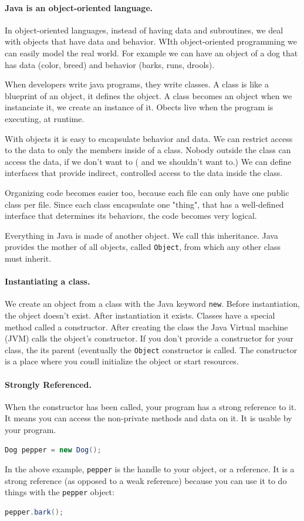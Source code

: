 \paragraph{Java is an object-oriented language.} In object-oriented languages, instead of having data and subroutines, we deal with objects that have data and behavior. WIth object-oriented programming we can easily model the real world. For example we can have an object of a dog that has data (color, breed) and behavior (barks, runs, drools). 

When developers write java programs, they write classes. A class is like a blueprint of an object, it defines the object. A class becomes an object when we instanciate it, we create an instance of it. Obects live when the program is executing, at runtime.

With objects it is easy to encapsulate behavior and data. We can restrict access to the data to only the members inside of a class. Nobody outside the class can access the data, if we don't want to ( and we shouldn't want to.) We can define interfaces that provide indirect, controlled access to the data inside the class.

Organizing code becomes easier too, because each file can only have one  public class per file. Since each class encapsulate one "thing", that has a well-defined interface that determines its behaviors, the code becomes very logical.

Everything in Java is made of another object. We call this inheritance. Java provides the mother of all objects, called \texttt{Object}, from which any other class must inherit.

\paragraph{Instantiating a class.} We create an object from a class with the Java keyword \texttt{new}. Before instantiation, the object doesn't exist. After instantiation it exists. Classes have a special method called a constructor. After creating the class the Java Virtual machine (JVM) calls the object's constructor. If you don't provide a constructor for your class, the its parent (eventually the \texttt{Object} constructor is called. The constructor is a place where you coudl initialize the object or start resources.\cite{nicholas}

\paragraph{Strongly Referenced.} When the constructor has been called, your program has a strong reference to it.\cite{reference} It means you can access the non-private methods and data on it. It is usable by your program.
\begin{lstlisting}[language=Java]
Dog pepper = new Dog();
\end{lstlisting}
In the above example, \texttt{pepper} is the handle to your object, or a reference. It is a strong reference (as opposed to a weak reference) because you can use it to do things with the \texttt{pepper} object:
\begin{lstlisting}[language=Java]
pepper.bark();
\end{lstlisting}

